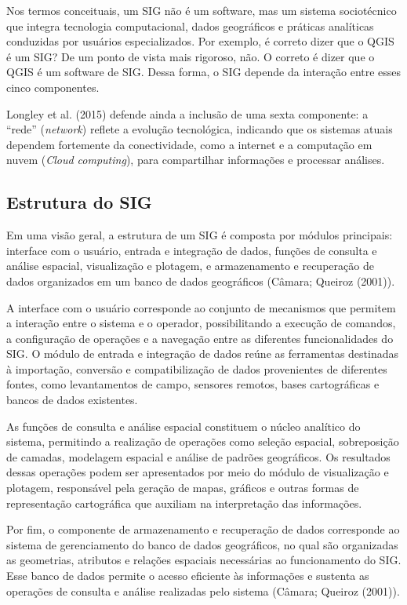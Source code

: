 \documentclass[
  letterpaper,
  DIV=11,
  numbers=noendperiod]{scrreprt}
\begin{document}
Nos termos conceituais, um SIG não é um software, mas um sistema
sociotécnico que integra tecnologia computacional, dados geográficos e
práticas analíticas conduzidas por usuários especializados. Por exemplo,
é correto dizer que o QGIS é um SIG? De um ponto de vista mais rigoroso,
não. O correto é dizer que o QGIS é um software de SIG. Dessa forma, o
SIG depende da interação entre esses cinco componentes.

Longley et al. (2015) defende ainda a inclusão de uma sexta componente:
a ``rede'' (\emph{network}) reflete a evolução tecnológica, indicando
que os sistemas atuais dependem fortemente da conectividade, como a
internet e a computação em nuvem (\emph{Cloud computing}), para
compartilhar informações e processar análises.

\subsection{Estrutura do SIG}\label{estrutura-do-sig}

Em uma visão geral, a estrutura de um SIG é composta por módulos
principais: interface com o usuário, entrada e integração de dados,
funções de consulta e análise espacial, visualização e plotagem, e
armazenamento e recuperação de dados organizados em um banco de dados
geográficos (Câmara; Queiroz (2001)).

A interface com o usuário corresponde ao conjunto de mecanismos que
permitem a interação entre o sistema e o operador, possibilitando a
execução de comandos, a configuração de operações e a navegação entre as
diferentes funcionalidades do SIG. O módulo de entrada e integração de
dados reúne as ferramentas destinadas à importação, conversão e
compatibilização de dados provenientes de diferentes fontes, como
levantamentos de campo, sensores remotos, bases cartográficas e bancos
de dados existentes.

As funções de consulta e análise espacial constituem o núcleo analítico
do sistema, permitindo a realização de operações como seleção espacial,
sobreposição de camadas, modelagem espacial e análise de padrões
geográficos. Os resultados dessas operações podem ser apresentados por
meio do módulo de visualização e plotagem, responsável pela geração de
mapas, gráficos e outras formas de representação cartográfica que
auxiliam na interpretação das informações.

Por fim, o componente de armazenamento e recuperação de dados
corresponde ao sistema de gerenciamento do banco de dados geográficos,
no qual são organizadas as geometrias, atributos e relações espaciais
necessárias ao funcionamento do SIG. Esse banco de dados permite o
acesso eficiente às informações e sustenta as operações de consulta e
análise realizadas pelo sistema (Câmara; Queiroz (2001)).
\end{document}

